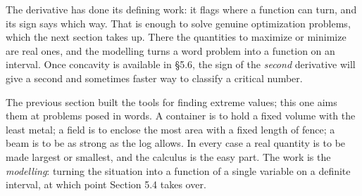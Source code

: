 \documentclass[a4paper,12pt,oneside]{memoir}
\begin{document}
The derivative has done its defining work: it flags where a function can turn, and its sign says which way. That is enough to solve genuine optimization problems, which the next section takes up. There the quantities to maximize or minimize are real ones, and the modelling turns a word problem into a function on an interval. Once concavity is available in §5.6, the sign of the \emph{second} derivative will give a second and sometimes faster way to classify a critical number.


The previous section built the tools for finding extreme values; this one aims them at problems posed in words. A container is to hold a fixed volume with the least metal; a field is to enclose the most area with a fixed length of fence; a beam is to be as strong as the log allows. In every case a real quantity is to be made largest or smallest, and the calculus is the easy part. The work is the \emph{modelling}: turning the situation into a function of a single variable on a definite interval, at which point Section 5.4 takes over.
\end{document}

